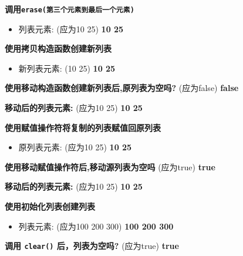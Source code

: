 \documentclass{article}
\begin{document}
\textbf{调用\texttt{erase(第三个元素到最后一个元素)}}  
\begin{itemize}  
    \item 列表元素: (应为10 25) \textbf{10 25}  
\end{itemize}  
  
\textbf{使用拷贝构造函数创建新列表}  
\begin{itemize}  
    \item 新列表元素: (10 25) \textbf{10 25}  
\end{itemize}  
  
\textbf{使用移动构造函数创建新列表后,原列表为空吗?} (应为false) \textbf{false}  
  
\textbf{移动后的列表元素:} (应为10 25) \textbf{10 25}  
  
\textbf{使用赋值操作符将复制的列表赋值回原列表}  
\begin{itemize}  
    \item 原列表元素: (应为10 25) \textbf{10 25}  
\end{itemize}  
  
\textbf{使用移动赋值操作符后,移动源列表为空吗} (应为true) \textbf{true}  
  
\textbf{移动后的列表元素:} (应为10 25) \textbf{10 25}  
  
\textbf{使用初始化列表创建列表}  
\begin{itemize}  
    \item 列表元素: (应为100 200 300) \textbf{100 200 300}  
\end{itemize}  
  
\textbf{调用 \texttt{clear()} 后，列表为空吗?} (应为true) \textbf{true}  
  
\end{document}
